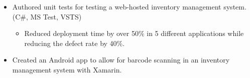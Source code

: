 \documentclass[10pt,letterpaper,sans]{moderncv}   %
\begin{document}
{ {}
\begin{itemize}
    \item Authored unit tests for testing a web-hosted inventory management system. (C\#, MS Test, VSTS)
    \begin{itemize}
        \item Reduced deployment time by over 50\% in 5 different applications while reducing the defect rate by 40\%.
    \end{itemize}
    \item Created an Android app to allow for barcode scanning in an inventory management system with Xamarin.
\end{itemize}}



\vspace*{-3mm}

\end{document}
